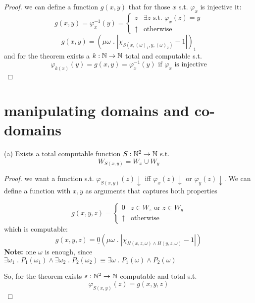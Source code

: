 \begin{proof}
  we can define a function $g(x,y)$ that for those $x$
  s.t. $\varphi_x$ is injective it:
  \[
    g(x,y) = \varphi_x^{-1}(y) = \begin{cases}
      z & \exists z \mbox{ s.t. } \varphi_x(z) = y \\
      \uparrow & \mbox{otherwise}
    \end{cases}
  \]
  \[
    g(x,y) = (\mu \omega \; . \; |\chi_{S(x, (\omega)_1, y, (\omega)_2)} - 1|)_1
  \]
  and for the \smn theorem exists a $k: \mathbb{N} \rightarrow \mathbb{N}$ total and
  computable s.t.
  \[\varphi_{k(x)}(y) = g(x,y) = \varphi_x^{-1}(y) \mbox{ if }
    \varphi_x \mbox{ is injective}\]
\end{proof}

\section{manipulating domains and co-domains}
(a) Exists a total computable function $S : \mathbb{N}^2 \rightarrow \mathbb{N}$
s.t. \[W_{S(x,y)} = W_x \cup W_y\]
\begin{proof}
  we want a function s.t. $\varphi_{S(x,y)}(z)\downarrow$ iff
  $\varphi_x(z)\downarrow$ or $\varphi_y(z) \downarrow$. We can define
  a function with $x,y$ as arguments that captures both properties

  \[
    g(x,y,z) = \begin{cases}
      0 & z \in W_z \mbox{ or } z \in W_y \\
      \uparrow  & \mbox{otherwise}
    \end{cases}
  \]
  which is computable:
  \[
    g(x,y,z) = \underline{0}(\mu \omega \; . \; |\chi_{H(x,z,\omega)
      \wedge H(y,z,\omega)} - 1|)
  \]
  \textbf{Note:} one $\omega$ is enough, since
  $\exists \omega_1 \; . \; P_1(\omega_1) \wedge \exists \omega_2 \;
  . \; P_2(\omega_2) \equiv \exists \omega \; . \; P_1(\omega) \wedge
  P_2(\omega)$

  So, for the \smn theorem exists $s:\mathbb{N}^2 \rightarrow \mathbb{N}$
  computable and total s.t. \[\varphi_{S(x,y)}(z) = g(x,y,z)\]
\end{proof}

